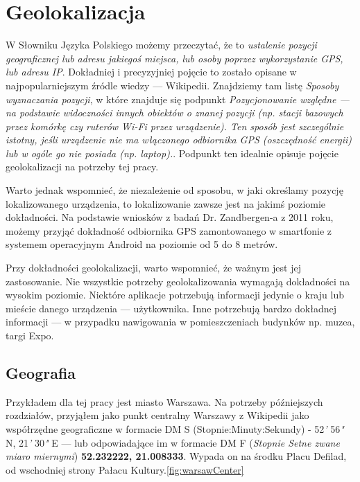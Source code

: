 \section{Geolokalizacja}
W Słowniku Języka Polskiego możemy przeczytać, że to \textit{ustalenie pozycji geograficznej lub adresu jakiegoś miejsca, lub osoby poprzez wykorzystanie GPS, lub adresu IP}\cite{GeolokalizacjaSJP}. Dokładniej i precyzyjniej pojęcie to zostało opisane w najpopularniejszym źródle wiedzy — Wikipedii. Znajdziemy tam listę \textit{Sposoby wyznaczania pozycji}, w które znajduje się podpunkt \textit{Pozycjonowanie względne — na podstawie widoczności innych obiektów o znanej pozycji (np. stacji bazowych przez komórkę czy ruterów Wi-Fi przez urządzenie). Ten sposób jest szczególnie istotny, jeśli urządzenie nie ma włączonego odbiornika GPS (oszczędność energii) lub w ogóle go nie posiada (np. laptop).}\cite{GeolokalizacjaWiki}. Podpunkt ten idealnie opisuje pojęcie geolokalizacji na potrzeby tej pracy.

Warto jednak wspomnieć, że niezależenie od sposobu, w jaki określamy pozycję lokalizowanego urządzenia, to lokalizowanie zawsze jest na jakimś poziomie dokładności. Na podstawie wniosków z badań Dr. Zandbergen-a z 2011 roku, możemy przyjąć dokładność odbiornika GPS zamontowanego w smartfonie z systemem operacyjnym Android na poziomie od 5 do 8 metrów.\cite{GpsAccurancyZandbergen}

Przy dokładności geolokalizacji, warto wspomnieć, że ważnym jest jej zastosowanie. Nie wszystkie potrzeby geolokalizowania wymagają dokładności na wysokim poziomie. Niektóre aplikacje potrzebują informacji jedynie o kraju lub mieście danego urządzenia — użytkownika. Inne potrzebują bardzo dokładnej informacji — w przypadku nawigowania w pomieszczeniach budynków np. muzea, targi Expo. %



\subsection{Geografia}
Przykładem dla tej pracy jest miasto Warszawa. Na potrzeby późniejszych rozdziałów, przyjąłem jako punkt centralny Warszawy z Wikipedii\cite{WarszawaWiki} jako współrzędne geograficzne w formacie DM S (Stopnie:Minuty:Sekundy) - 52\textit{'} 56\textit{"} N, 21\textit{'} 30\textit{"} E — lub odpowiadające im w formacie DM F (\textit{Stopnie Setne zwane miaro miernymi})\cite{WspolrzedneWiki} \textbf{52.232222, 21.008333}. Wypada on na środku Placu Defilad, od wschodniej strony Pałacu Kultury.\ref{fig:warsawCenter}

